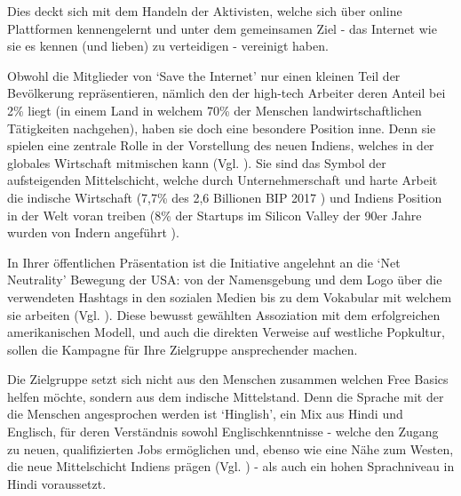 \documentclass{article}
\begin{document}
\medskip

Dies deckt sich mit dem Handeln der Aktivisten, welche sich über online Plattformen kennengelernt und unter dem gemeinsamen Ziel - das Internet wie sie es kennen (und lieben) zu verteidigen - vereinigt haben.

\medskip

Obwohl die Mitglieder von `Save the Internet' nur einen kleinen Teil der Bevölkerung repräsentieren, nämlich den der high-tech Arbeiter deren Anteil bei 2\% liegt (in einem Land in welchem 70\% der Menschen landwirtschaftlichen Tätigkeiten nachgehen), haben sie doch eine besondere Position inne. Denn sie spielen eine zentrale Rolle in der Vorstellung des neuen Indiens, welches in der globales Wirtschaft mitmischen kann (Vgl. \cite{thomas2012}).
Sie sind das Symbol der aufsteigenden Mittelschicht, welche durch Unternehmerschaft und harte Arbeit die indische Wirtschaft (7,7\% des 2,6 Billionen BIP 2017 \autocite{statistaIndiaGDP}\autocite{imfIndiaGDP}) und Indiens Position in der Welt voran treiben (8\% der Startups im Silicon Valley der 90er Jahre wurden von Indern angeführt \parencite{upadhya2004}).

\medskip

In Ihrer öffentlichen Präsentation ist die Initiative angelehnt an die `Net Neutrality' Bewegung der USA: von der Namensgebung und dem Logo über die verwendeten Hashtags in den sozialen Medien bis zu dem Vokabular mit welchem sie arbeiten (Vgl. \cite{prasad2017}).
Diese bewusst gewählten Assoziation mit dem erfolgreichen amerikanischen Modell, und auch die direkten Verweise auf westliche Popkultur, sollen die Kampagne für Ihre Zielgruppe ansprechender machen.

Die Zielgruppe setzt sich nicht aus den Menschen zusammen welchen Free Basics helfen möchte, sondern aus dem indische Mittelstand. Denn die Sprache mit der die Menschen angesprochen werden ist `Hinglish', ein Mix aus Hindi und Englisch, für deren Verständnis sowohl Englischkenntnisse - welche den Zugang zu neuen, qualifizierten Jobs ermöglichen und, ebenso wie eine Nähe zum Westen, die neue Mittelschicht Indiens prägen (Vgl. \cite{fernandes2006}) - als auch ein hohen Sprachniveau in Hindi voraussetzt.

\medskip
\end{document}
